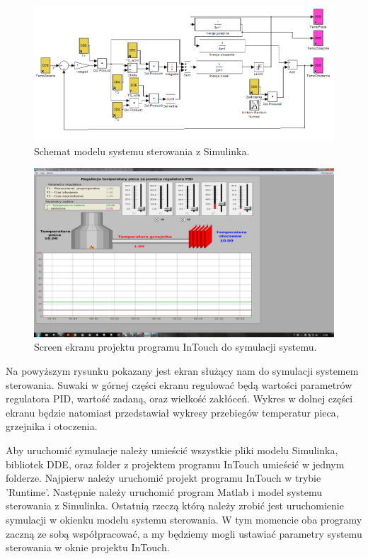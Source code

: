 \documentclass[a4paper,10pt]{article}
\begin{document}
\begin{figure}[!h]
    \centering
	\includegraphics[width=120mm]{CW6-model.png}
	\caption{Schemat modelu systemu sterowania z Simulinka.}
    \label{fig:Rysunek}
\end{figure}
\begin{figure}[!h]
    \centering
	\includegraphics[width=120mm]{CW6-start.png}
	\caption{Screen ekranu projektu programu InTouch do symulacji systemu.}
    \label{fig:Rysunek}
\end{figure}
Na powyższym rysunku pokazany jest ekran służący nam do symulacji systemem sterowania. Suwaki w górnej części ekranu regulować będą wartości parametrów regulatora PID, wartość zadaną, oraz wielkość zakłóceń. Wykres w dolnej części ekranu będzie natomiast przedstawiał wykresy przebiegów temperatur pieca, grzejnika i otoczenia.

Aby uruchomić symulacje należy umieścić wszystkie pliki modelu Simulinka, bibliotek DDE, oraz folder z projektem programu InTouch umieścić w jednym folderze. Najpierw należy uruchomić projekt programu InTouch w trybie 'Runtime'. Następnie należy uruchomić program Matlab i model systemu sterowania z Simulinka. Ostatnią rzeczą którą należy zrobić jest uruchomienie symulacji w okienku modelu systemu sterowania. W tym momencie oba programy zaczną ze sobą współpracować, a my będziemy mogli ustawiać parametry systemu sterowania w oknie projektu InTouch.
\end{document}
